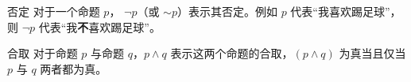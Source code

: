
\begin{definition}{否定}
对于一个命题 $p$， $\neg p$（或 $\sim p$）表示其否定。例如 $p$ 代表“我喜欢踢足球”，则 $\neg p$ 代表“我\textbf{不}喜欢踢足球”。
\end{definition}

\begin{definition}{合取}
对于命题 $p$ 与命题 $q$，$p \land q$ 表示这两个命题的合取，$(p \land q)$ 为真当且仅当 $p$ 与 $q$ 两者都为真。
\end{definition}
